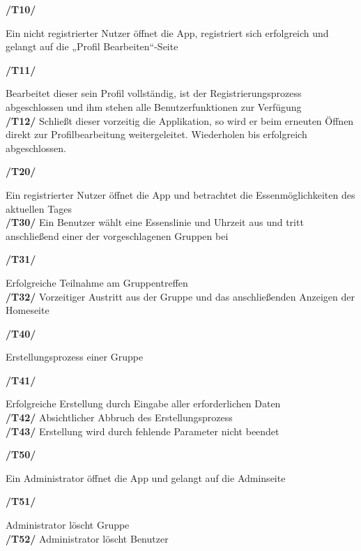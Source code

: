 \documentclass[a4paper]{scrreprt}
\begin{document}
\begin{addmargin}[25pt]{0pt} 
\hypertarget{t10}{\textbf{/T10/}} Ein nicht registrierter Nutzer öffnet die App, registriert sich erfolgreich und gelangt auf die „Profil Bearbeiten“-Seite\\
  \begin{addmargin}[25pt]{0pt} 
  \hypertarget{t11}{\textbf{/T11/}} Bearbeitet dieser sein Profil vollständig, ist der Registrierungsprozess abgeschlossen und ihm stehen alle Benutzerfunktionen zur Verfügung\\
  \hypertarget{t12}{\textbf{/T12/}} Schließt dieser vorzeitig die Applikation, so wird er beim erneuten Öffnen direkt zur Profilbearbeitung weitergeleitet. Wiederholen bis erfolgreich abgeschlossen.\\
  \end{addmargin}
\hypertarget{t20}{\textbf{/T20/}} Ein registrierter Nutzer öffnet die App und betrachtet die Essenmöglichkeiten des aktuellen Tages\\
\hypertarget{t30}{\textbf{/T30/}} Ein Benutzer wählt eine Essenslinie und Uhrzeit aus und tritt anschließend einer der vorgeschlagenen Gruppen bei\\
  \begin{addmargin}[25pt]{0pt} 
  \hypertarget{t31}{\textbf{/T31/}} Erfolgreiche Teilnahme am Gruppentreffen\\
  \hypertarget{t32}{\textbf{/T32/}} Vorzeitiger Austritt aus der Gruppe und das anschließenden Anzeigen der Homeseite\\
  \end{addmargin}
\hypertarget{t40}{\textbf{/T40/}}  Erstellungsprozess einer Gruppe\\
  \begin{addmargin}[25pt]{0pt} 
  \hypertarget{t41}{\textbf{/T41/}} Erfolgreiche Erstellung durch Eingabe aller erforderlichen Daten\\
  \hypertarget{t42}{\textbf{/T42/}} Absichtlicher Abbruch des Erstellungsprozess\\
  \hypertarget{t43}{\textbf{/T43/}} Erstellung wird durch fehlende Parameter nicht beendet\\
  \end{addmargin}
\hypertarget{t50}{\textbf{/T50/}} Ein Administrator öffnet die App und gelangt auf die Adminseite\\
  \begin{addmargin}[25pt]{0pt} 
  \hypertarget{t10}{\textbf{/T51/}} Administrator löscht Gruppe\\
  \hypertarget{t10}{\textbf{/T52/}} Administrator löscht Benutzer\\
  \end{addmargin}



\end{addmargin}
\end{document}

